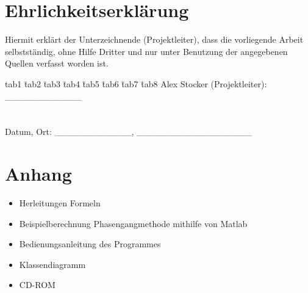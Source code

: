 \documentclass{fhnwreport}
\begin{document}
\section{Ehrlichkeitserklärung}
Hiermit erklärt der Unterzeichnende (Projektleiter), dass die vorliegende Arbeit selbstständig, ohne Hilfe Dritter und nur unter Benutzung der angegebenen Quellen verfasst worden ist.\newline
\\

\begin{tabbing}
tab1 \= tab2 \= tab3 \= tab4 \= tab5 \=tab6 \= tab7 \= tab8 \kill
Alex Stocker (Projektleiter): \>\>\>\>\>\>\_\_\_\_\_\_\_\_\_\_\_\_\\
\\
\\
Datum, Ort: \>\>\>\>\>\>\_\_\_\_\_\_\_\_\_\_\_\_, \_\_\_\_\_\_\_\_\_\_\_\_\_\_\_\_\_\_\\
\end{tabbing}



\newpage

\listoffigures
\listoftables


\newpage
\section{Anhang}
\begin{itemize}
\item Herleitungen Formeln
\item Beispielberechnung Phasengangmethode mithilfe von Matlab
\item Bedienungsanleitung des Programmes 
\item Klassendiagramm
\item CD-ROM

\end{itemize}


 
\end{document}
